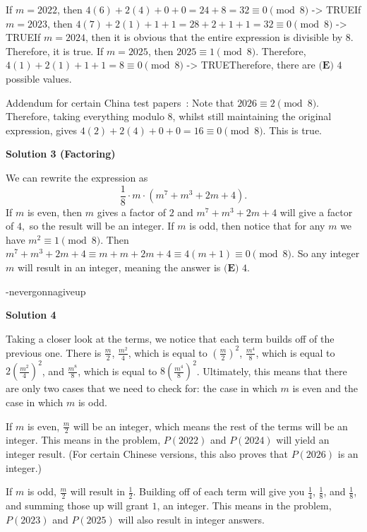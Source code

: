 \begin{enumerate}
 If $m = 2022$, then $4(6) + 2(4) + 0 + 0 = 24 + 8 = 32 \equiv 0 \pmod 8$ -> TRUEIf $m = 2023$, then $4(7) + 2(1) + 1 + 1 = 28 + 2 + 1 + 1 = 32 \equiv 0 \pmod 8$ -> TRUEIf $m = 2024$, then it is obvious that the entire expression is divisible by 8. Therefore, it is true. If $m = 2025$, then $2025 \equiv 1 \pmod 8$. Therefore, $4(1) + 2(1) + 1 + 1 = 8 \equiv 0 \pmod 8$ -> TRUETherefore, there are $\boxed{\textbf{(E) }4}$ possible values. 

 Addendum for certain China test papers : Note that $2026 \equiv 2 \pmod 8$. Therefore, taking everything modulo 8, whilst still maintaining the original expression, gives $4(2) + 2(4) + 0 + 0 = 16 \equiv 0 \pmod 8$. This is true. 

 



\textbf{Solution 3 (Factoring)}

We can rewrite the expression as 
 \[\frac{1}{8}\cdot m \cdot (m^7+m^3+2m+4).\] If $m$ is even, then $m$ gives a factor of $2$ and $m^7+m^3+2m+4$ will give a factor of $4,$ so the result will be an integer. If $m$ is odd, then notice that for any $m$ we have $m^2\equiv 1 \pmod{8}.$ Then $m^7+m^3+2m+4\equiv m+m+2m+4 \equiv 4(m+1) \equiv 0 \pmod{8}.$ So any integer $m$ will result in an integer, meaning the answer is $\boxed{\textbf{(E) }4}$.

 -nevergonnagiveup

 



\textbf{Solution 4}

Taking a closer look at the terms, we notice that each term builds off of the previous one. There is $\frac{m}{2}$, $\frac{m^{2}}{4}$, which is equal to $\left(\frac{m}{2}\right)^{2}$, $\frac{m^{4}}{8}$, which is equal to $2\left(\frac{m^{2}}{4}\right)^{2}$, and $\frac{m^{8}}{8}$, which is equal to $8\left(\frac{m^{4}}{8}\right)^{2}$. Ultimately, this means that there are only two cases that we need to check for: the case in which $m$ is even and the case in which $m$ is odd.

 If $m$ is even, $\frac{m}{2}$ will be an integer, which means the rest of the terms will be an integer. This means in the problem, $P(2022)$ and $P(2024)$ will yield an integer result. (For certain Chinese versions, this also proves that $P(2026)$ is an integer.)

 If $m$ is odd, $\frac{m}{2}$ will result in $\frac{1}{2}$. Building off of each term will give you $\frac{1}{4}$, $\frac{1}{8}$, and $\frac{1}{8}$, and summing those up will grant $1$, an integer. This means in the problem, $P(2023)$ and $P(2025)$ will also result in integer answers.


\end{enumerate}
